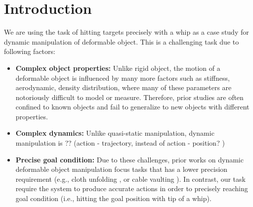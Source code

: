 \section{Introduction}

\todo{} 

We are using the task of hitting targets precisely with a whip as a case study for dynamic manipulation of deformable object. This is a challenging task due to following factors: 
\begin{itemize}[leftmargin=3mm]

\item \textbf{Complex object properties:} Unlike  rigid object, the motion of a deformable object is influenced by many more factors such as stiffness, aerodynamic, density distribution, where many of these parameters are notoriously difficult to model or measure. 
Therefore, prior studies are often confined to known objects and fail to generalize to new objects with different properties. 

\item \textbf{Complex dynamics:} Unlike quasi-static manipulation, dynamic manipulation is ??  (action - trajectory, instead of action - position? ) %


\item \textbf{Precise goal condition:}  Due to these challenges, prior works on dynamic deformable object manipulation focus tasks that has a lower precision requirement (e.g., cloth unfolding \cite{ha2021flingbot}, or cable vaulting \cite{zhang2021robots}). In contrast, our task require the system to produce accurate actions in order to precisely reaching goal condition (i.e., hitting the goal position with \the tip of a whip). 

\end{itemize}


